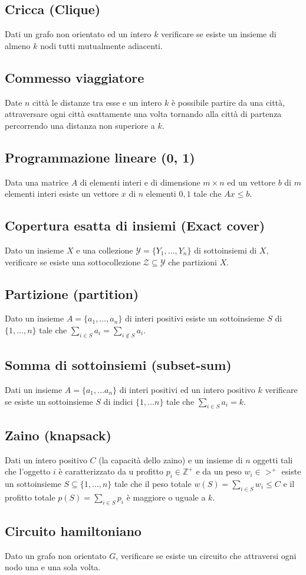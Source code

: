 \subsection{Cricca (Clique)}
Dati un grafo non orientato ed un intero $k$ verificare se esiste un insieme di almeno $k$ nodi tutti mutualmente adiacenti.
\subsection{Commesso viaggiatore}
Date $n$ citt\`a le distanze tra esse e un intero $k$ \`e possibile partire da una citt\`a, attraversare ogni citt\`a esattamente una volta tornando alla citt\`a di partenza percorrendo
una distanza non superiore a $k$.
\subsection{Programmazione lineare (0, 1)}
Data una matrice $A$ di elementi interi e di dimensione $m\times n$ ed un vettore $b$ di $m$ elementi interi esiste un vettore $x$ di $n$ elementi $0, 1$ tale che $Ax\le b$.
\subsection{Copertura esatta di insiemi (Exact cover)}
Dato un insieme $X$ e una collezione $\mathcal{Y}=\{Y_1, \dots, Y_n\}$ di sottoinsiemi di $X$, verificare se esiste una sottocollezione $\mathcal{Z}\subseteq\mathcal{Y}$ che partizioni 
$X$.
\subsection{Partizione (partition)}
Dato un insieme $A=\{a_1, \dots, a_n\}$ di interi positivi esiste un sottoinsieme $S$ di $\{1, \dots,n\}$ tale che $\sum\limits_{i\in S}a_i = \sum\limits_{i\not\in S}a_i$.
\subsection{Somma di sottoinsiemi (subset-sum)}
Dati un insieme $A=\{a_1,\dots a_n\}$ di interi positivi ed un intero positivo $k$ verificare se esiste un sottoinsieme $S$ di indici $\{1, \dots n\}$ tale che 
$\sum\limits_{i\in S}a_i = k$.
\subsection{Zaino (knapsack)}
Dati un intero positivo $C$ (la capacit\`a dello zaino) e un insieme di $n$ oggetti tali che l'oggetto $i$ \`e caratterizzato da u profitto $p_i\in \mathbb{Z}^+$ e da un peso 
$w_i\in\mathbb{>}^+$ esiste un sottoinsieme $S\subseteq\{1, \dots, n\}$ tale che il peso totale $w(S)=\sum\limits_{i\in S} w_i\le C$ e il profitto totale $p(S) = \sum\limits_{i\in S}p_i$
\`e maggiore o uguale a $k$.
\subsection{Circuito hamiltoniano}
Dato un grafo non orientato $G$, verificare se esiste un circuito che attraversi ogni nodo una e una sola volta.

